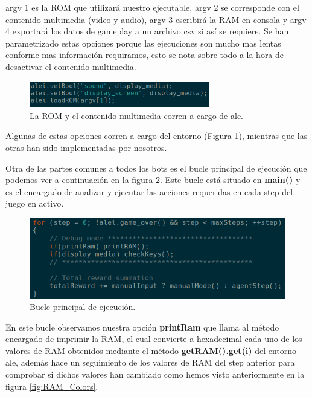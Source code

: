 argv 1 es la ROM que utilizará nuestro ejecutable, argv 2 se corresponde con el contenido multimedia (video y audio), argv 3 escribirá la RAM en consola y argv 4 exportará los datos de gameplay a un archivo \ac{csv} si así se requiere. Se han parametrizado estas opciones porque las ejecuciones son mucho mas lentas conforme mas información requiramos, esto se nota sobre todo a la hora de desactivar el contenido multimedia.

\begin{figure}[h]
	\centering
	\includegraphics[width=0.7\textwidth]{Figures/ALEromANDmedia}
	\caption{La ROM y el contenido multimedia corren a cargo de \ac{ale}.}
	\label{fig:ALEromANDmedia}
\end{figure}

\newpage
Algunas de estas opciones corren a cargo del entorno (Figura 	\ref{fig:ALEromANDmedia}), mientras que las otras han sido implementadas por nosotros.

Otra de las partes comunes a todos los bots es el bucle principal de ejecución que podemos ver a continuación en la figura \ref{fig:ALEMainExecLoop}. Este bucle está situado en \textbf{main()} y es el encargado de analizar y ejecutar las acciones requeridas en cada step del juego en activo.

\begin{figure}[h]
	\centering
	\includegraphics[width=1\textwidth]{Figures/ALEMainExecLoop}
	\caption{Bucle principal de ejecución.}
	\label{fig:ALEMainExecLoop}
\end{figure}

En este bucle observamos nuestra opción \textbf{printRam} que llama al método encargado de imprimir la RAM, el cual convierte a hexadecimal cada uno de los valores de RAM obtenidos mediante el método \textbf{getRAM().get(i)} del entorno \ac{ale}, además hace un seguimiento de los valores de RAM del step anterior para comprobar si dichos valores han cambiado como hemos visto anteriormente en la figura \ref{fig:RAM_Colors}.


